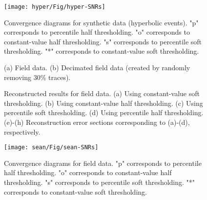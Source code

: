 {\begin{figure}[htb!]
  \centering
  \texttt{[image: hyper/Fig/hyper-SNRs]}

	\caption{Convergence diagrams for synthetic data (hyperbolic events). "p" corresponds to percentile half thresholding. "o" corresponds to constant-value half thresholding. "s" corresponds to percentile soft thresholding. "*" corresponds to constant-value soft thresholding. }
	    \label{fig:hyper-SNRs}
\end{figure}


\begin{figure}[htb!]
  \centering
	\caption{(a) Field data. (b) Decimated field data (created by randomly removing 30\% traces).}
   \label{fig:sean,sean-zero}
\end{figure}

\begin{figure}[htb!]
  \centering
	\caption{Reconstructed results for field data.  (a) Using constant-value soft thresholding. (b) Using constant-value half thresholding.  (c) Using percentile soft thresholding. (d) Using percentile half thresholding.  (e)-(h) Reconstruction error sections corresponding to (a)-(d), respectively.}
   \label{fig:sean-data2,sean-data3,sean-data5,sean-data6,sean-diff2,sean-diff3,sean-diff5,sean-diff6}
\end{figure}

\begin{figure}[htb!]
  \centering
  \texttt{[image: sean/Fig/sean-SNRs]}
	\caption{Convergence diagrams for field data. "p" corresponds to percentile half thresholding. "o" corresponds to constant-value half thresholding. "s" corresponds to percentile soft thresholding. "*" corresponds to constant-value soft thresholding. }
	    \label{fig:sean-SNRs}
\end{figure}
}





\newpage
\listoffigures
\newpage









